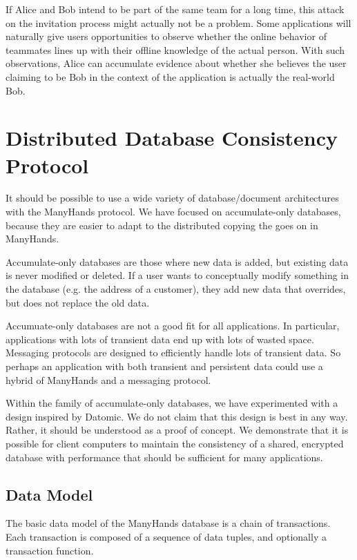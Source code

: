 \documentclass[pldi,10pt]{sigplanconf-pldi16}
\begin{document}
If Alice and Bob intend to be part of the same team for a long time, this attack on the invitation process might actually not be a problem.
Some applications will naturally give users opportunities to observe whether the online behavior of teammates lines up with their offline knowledge of the actual person.
With such observations, Alice can accumulate evidence about whether she believes the user claiming to be Bob in the context of the application is actually the real-world Bob.

\section{Distributed Database Consistency Protocol}

It should be possible to use a wide variety of database/document architectures with the ManyHands protocol.
We have focused on accumulate-only databases, because they are easier to adapt to the distributed copying the goes on in ManyHands.

Accumulate-only databases are those where new data is added, but existing data is never modified or deleted.
If a user wants to conceptually modify something in the database (e.g. the address of a customer), they add new data that overrides, but does not replace the old data.

Accumuate-only databases are not a good fit for all applications.
In particular, applications with lots of transient data end up with lots of wasted space.
Messaging protocols are designed to efficiently handle lots of transient data.
So perhaps an application with both transient and persistent data could use a hybrid of ManyHands and a messaging protocol.

Within the family of accumulate-only databases, we have experimented with a design inspired by Datomic.
We do not claim that this design is best in any way.
Rather, it should be understood as a proof of concept.
We demonstrate that it is possible for client computers to maintain the consistency of a shared, encrypted database with performance that should be sufficient for many applications.

\subsection{Data Model}

The basic data model of the ManyHands database is a chain of transactions.
Each transaction is composed of a sequence of data tuples, and optionally a transaction function.
\end{document}
